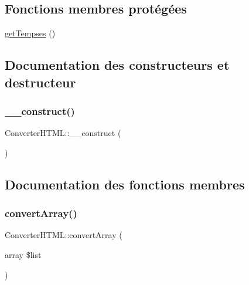 \subsection*{Fonctions membres protégées}
\begin{DoxyCompactItemize}
\item 
\hyperlink{class_converter_h_t_m_l_a385bc4a802dc51c920ea5152df4adcb3}{get\+Tempses} ()
\end{DoxyCompactItemize}


\subsection{Documentation des constructeurs et destructeur}
\hypertarget{class_converter_h_t_m_l_a036f13d611af2b8e6c24c73dfb3d60c4}{}\label{class_converter_h_t_m_l_a036f13d611af2b8e6c24c73dfb3d60c4} 
\subsubsection{\texorpdfstring{\+\_\+\+\_\+construct()}{\_\_construct()}}
{\footnotesize\ttfamily Converter\+H\+T\+M\+L\+::\+\_\+\+\_\+construct (\begin{DoxyParamCaption}{ }\end{DoxyParamCaption})}



\subsection{Documentation des fonctions membres}
\hypertarget{class_converter_h_t_m_l_a62390602025ffe49e7b339a7782ddf72}{}\label{class_converter_h_t_m_l_a62390602025ffe49e7b339a7782ddf72} 
\subsubsection{\texorpdfstring{convert\+Array()}{convertArray()}}
{\footnotesize\ttfamily Converter\+H\+T\+M\+L\+::convert\+Array (\begin{DoxyParamCaption}\item[{array}]{\$list }\end{DoxyParamCaption})}

